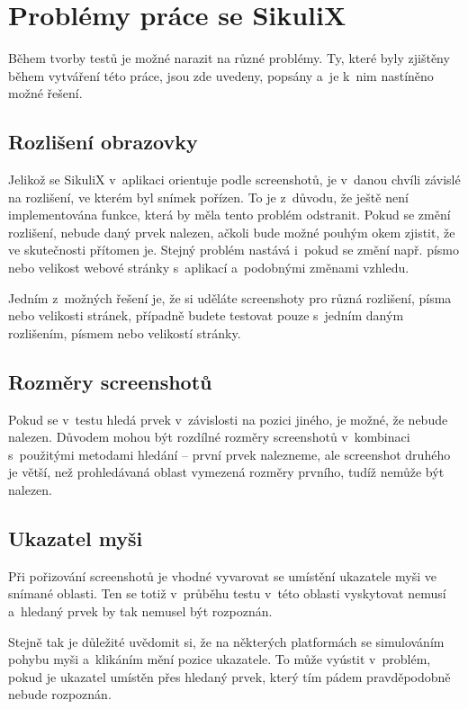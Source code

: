 \chapter{Problémy práce se SikuliX}
Během tvorby testů je možné narazit na různé problémy. Ty, které byly zjištěny během vytváření této práce, jsou zde uvedeny, popsány a~je k~nim nastíněno možné řešení.

	\section{Rozlišení obrazovky}
	Jelikož se SikuliX v~aplikaci orientuje podle screenshotů, je v~danou chvíli závislé na rozlišení, ve kterém byl snímek pořízen. To je z~důvodu, že ještě není implementována funkce, která by měla tento problém odstranit. Pokud se změní rozlišení, nebude daný prvek nalezen, ačkoli bude možné pouhým okem zjistit, že ve skutečnosti přítomen je. Stejný problém nastává i~pokud se změní např. písmo nebo velikost webové stránky s~aplikací a~podobnými změnami vzhledu.
	
	Jedním z~možných řešení je, že si uděláte screenshoty pro různá rozlišení, písma nebo velikosti stránek, případně budete testovat pouze s~jedním daným rozlišením, písmem nebo velikostí stránky.
	
	\section{Rozměry screenshotů}
	Pokud se v~testu hledá prvek v~závislosti na pozici jiného, je možné, že nebude nalezen. Důvodem mohou být rozdílné rozměry screenshotů v~kombinaci s~použitými metodami hledání -- první prvek nalezneme, ale screenshot druhého je větší, než prohledávaná oblast vymezená rozměry prvního, tudíž nemůže být nalezen.
	
	\section{Ukazatel myši}
	Při pořizování screenshotů je vhodné vyvarovat se umístění ukazatele myši ve snímané oblasti. Ten se totiž v~průběhu testu v~této oblasti vyskytovat nemusí a~hledaný prvek by tak nemusel být rozpoznán.
	
	Stejně tak je důležité uvědomit si, že na některých platformách se simulováním pohybu myši a~klikáním mění pozice ukazatele. To může vyústit v~problém, pokud je ukazatel umístěn přes hledaný prvek, který tím pádem pravděpodobně nebude rozpoznán.
	
